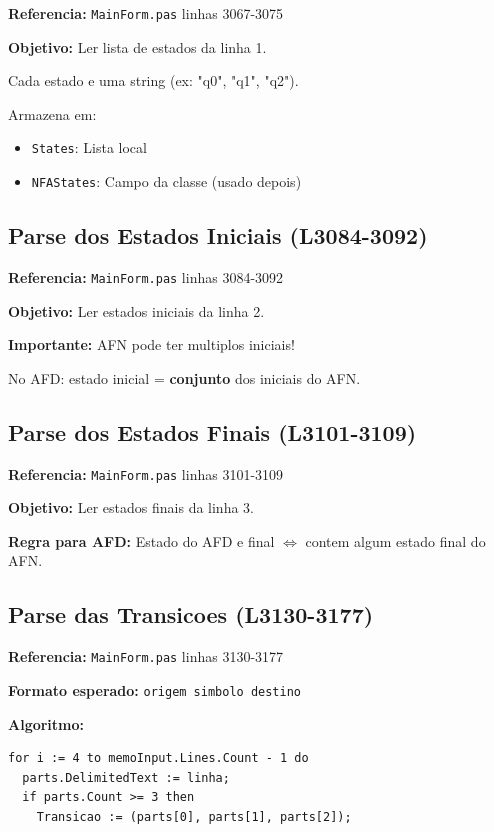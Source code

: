 \documentclass[12pt,a4paper]{article}
\begin{document}
\textbf{Referencia:} \texttt{MainForm.pas} linhas 3067-3075

\textbf{Objetivo:} Ler lista de estados da linha 1.

Cada estado e uma string (ex: "q0", "q1", "q2").

Armazena em:
\begin{itemize}
    \item \texttt{States}: Lista local
    \item \texttt{NFAStates}: Campo da classe (usado depois)
\end{itemize}

\subsection{Parse dos Estados Iniciais (L3084-3092)}

\textbf{Referencia:} \texttt{MainForm.pas} linhas 3084-3092

\textbf{Objetivo:} Ler estados iniciais da linha 2.

\textbf{Importante:} AFN pode ter multiplos iniciais!

No AFD: estado inicial = \textbf{conjunto} dos iniciais do AFN.

\subsection{Parse dos Estados Finais (L3101-3109)}

\textbf{Referencia:} \texttt{MainForm.pas} linhas 3101-3109

\textbf{Objetivo:} Ler estados finais da linha 3.

\textbf{Regra para AFD:} Estado do AFD e final $\Leftrightarrow$ contem algum estado final do AFN.

\subsection{Parse das Transicoes (L3130-3177)}

\textbf{Referencia:} \texttt{MainForm.pas} linhas 3130-3177

\textbf{Formato esperado:} \texttt{origem simbolo destino}

\textbf{Algoritmo:}
\begin{lstlisting}[style=pascal]
for i := 4 to memoInput.Lines.Count - 1 do
  parts.DelimitedText := linha;
  if parts.Count >= 3 then
    Transicao := (parts[0], parts[1], parts[2]);
\end{lstlisting}
\end{document}
